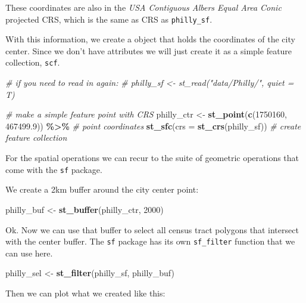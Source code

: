 \documentclass[
]{book}
\newenvironment{Shaded}{\begin{snugshade}}{\end{snugshade}}
\newcommand{\AttributeTok}[1]{\textcolor[rgb]{0.13,0.29,0.53}{#1}}
\newcommand{\CommentTok}[1]{\textcolor[rgb]{0.56,0.35,0.01}{\textit{#1}}}
\newcommand{\DecValTok}[1]{\textcolor[rgb]{0.00,0.00,0.81}{#1}}
\newcommand{\FloatTok}[1]{\textcolor[rgb]{0.00,0.00,0.81}{#1}}
\newcommand{\FunctionTok}[1]{\textcolor[rgb]{0.13,0.29,0.53}{\textbf{#1}}}
\newcommand{\NormalTok}[1]{#1}
\newcommand{\OtherTok}[1]{\textcolor[rgb]{0.56,0.35,0.01}{#1}}
\newcommand{\SpecialCharTok}[1]{\textcolor[rgb]{0.81,0.36,0.00}{\textbf{#1}}}
\begin{document}
These coordinates are also in the \emph{USA Contiguous Albers Equal Area Conic} projected CRS, which is the same as CRS as \texttt{philly\_sf}.

With this information, we create a object that holds the coordinates of the city center. Since we don't have attributes we will just create it as a simple feature collection, \texttt{scf}.

\begin{Shaded}
\begin{Highlighting}[]
\CommentTok{\# if you need to read in again:}
\CommentTok{\# philly\_sf \textless{}{-} st\_read("data/Philly/", quiet = T)}

\CommentTok{\# make a simple feature point with CRS}
\NormalTok{philly\_ctr }\OtherTok{\textless{}{-}} 
  \FunctionTok{st\_point}\NormalTok{(}\FunctionTok{c}\NormalTok{(}\DecValTok{1750160}\NormalTok{, }\FloatTok{467499.9}\NormalTok{)) }\SpecialCharTok{\%\textgreater{}\%} \CommentTok{\# point coordinates}
  \FunctionTok{st\_sfc}\NormalTok{(}\AttributeTok{crs =} \FunctionTok{st\_crs}\NormalTok{(philly\_sf))  }\CommentTok{\# create feature collection}
\end{Highlighting}
\end{Shaded}

For the spatial operations we can recur to the suite of geometric operations that come with the \texttt{sf} package.

We create a 2km buffer around the city center point:

\begin{Shaded}
\begin{Highlighting}[]
\NormalTok{philly\_buf }\OtherTok{\textless{}{-}} \FunctionTok{st\_buffer}\NormalTok{(philly\_ctr, }\DecValTok{2000}\NormalTok{)}
\end{Highlighting}
\end{Shaded}

Ok. Now we can use that buffer to select all census tract polygons that intersect with the center buffer. The \texttt{sf} package has its own \texttt{sf\_filter} function that we can use here.

\begin{Shaded}
\begin{Highlighting}[]
\NormalTok{philly\_sel }\OtherTok{\textless{}{-}} \FunctionTok{st\_filter}\NormalTok{(philly\_sf, philly\_buf)}
\end{Highlighting}
\end{Shaded}

Then we can plot what we created like this:
\end{document}

